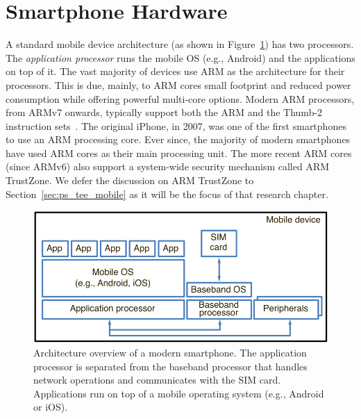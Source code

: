 \section{Smartphone Hardware}
\label{sec:bg_hardware}

A standard mobile device architecture (as shown in Figure~\ref{fig:bg_mobile})
has two processors. The \emph{application processor} runs the mobile OS (e.g.,
Android) and the applications on top of it. The vast majority of devices
use ARM as the architecture for their processors. This is due, mainly, to
ARM cores small footprint and reduced power consumption while offering powerful
multi-core options. Modern ARM processors, from ARMv7 onwards,
typically support both the ARM and the Thumb-2 instruction
sets~\cite{arminstructionset}. The original iPhone, in 2007, was one of the first smartphones to use an ARM processing core. Ever since, the majority of modern smartphones have used ARM cores as their main processing unit. The more recent ARM cores (since ARMv6) also support a system-wide security mechanism called ARM TrustZone. We defer the discussion on ARM TrustZone to Section~\ref{sec:ps_tee_mobile} as it will be the focus of that research chapter.

\begin{figure}[!ht]
    \centering
    \includegraphics[width=.9\linewidth]{figures/others/bg_smartphone}
    \caption[Architecture overview of a modern smartphone]{Architecture overview of a modern smartphone. The application processor is separated from the baseband processor that handles network operations and communicates with the SIM card. Applications run on top of a mobile operating system (e.g., Android or iOS).}
    \label{fig:bg_mobile}
\end{figure}

